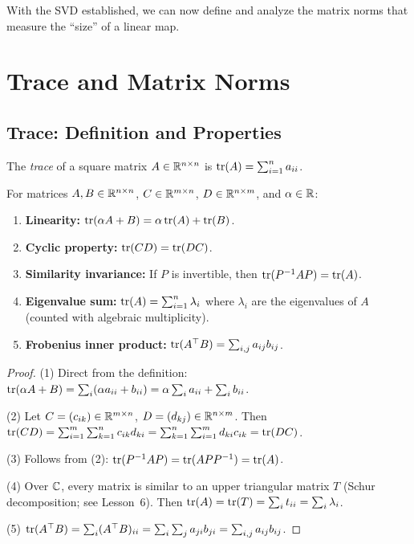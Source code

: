 \documentclass[11pt,a4paper]{article}
\begin{document}
With the SVD established, we can now define and analyze the matrix
norms that measure the ``size'' of a linear map.

\section{Trace and Matrix Norms}
\label{sec:norms}

\subsection{Trace: Definition and Properties}

\begin{definition}[Trace]
\label{def:trace}
The \emph{trace} of a square matrix $A \in \mathbb{R}^{n \times n}$ is
$\operatorname{tr}(A) = \sum_{i=1}^n a_{ii}$.
\end{definition}

\begin{proposition}
\label{prop:trace_properties}
For matrices $A, B \in \mathbb{R}^{n \times n}$, $C \in \mathbb{R}^{m \times n}$,
$D \in \mathbb{R}^{n \times m}$, and $\alpha \in \mathbb{R}$:
\begin{enumerate}[nosep]
  \item \textbf{Linearity:} $\operatorname{tr}(\alpha A + B) = \alpha \operatorname{tr}(A) + \operatorname{tr}(B)$.
  \item \textbf{Cyclic property:} $\operatorname{tr}(CD) = \operatorname{tr}(DC)$.
  \item \textbf{Similarity invariance:} If $P$ is invertible, then
        $\operatorname{tr}(P^{-1}AP) = \operatorname{tr}(A)$.
  \item \textbf{Eigenvalue sum:} $\operatorname{tr}(A) = \sum_{i=1}^n \lambda_i$
        where $\lambda_i$ are the eigenvalues of $A$ (counted with
        algebraic multiplicity).
  \item \textbf{Frobenius inner product:}
        $\operatorname{tr}(A^\top B) = \sum_{i,j} a_{ij} b_{ij}$.
\end{enumerate}
\end{proposition}

\begin{proof}
(1) Direct from the definition:
$\operatorname{tr}(\alpha A + B) = \sum_i (\alpha a_{ii} + b_{ii})
= \alpha \sum_i a_{ii} + \sum_i b_{ii}$.

(2) Let $C = (c_{ik}) \in \mathbb{R}^{m \times n}$, $D = (d_{kj}) \in \mathbb{R}^{n \times m}$.
Then $\operatorname{tr}(CD) = \sum_{i=1}^m \sum_{k=1}^n c_{ik} d_{ki}
= \sum_{k=1}^n \sum_{i=1}^m d_{ki} c_{ik} = \operatorname{tr}(DC)$.

(3) Follows from (2): $\operatorname{tr}(P^{-1}AP) = \operatorname{tr}(APP^{-1}) = \operatorname{tr}(A)$.

(4) Over $\mathbb{C}$, every matrix is similar to an upper triangular matrix $T$
(Schur decomposition; see Lesson~6).  Then $\operatorname{tr}(A) = \operatorname{tr}(T) = \sum_i t_{ii}
= \sum_i \lambda_i$.

(5) $\operatorname{tr}(A^\top B) = \sum_i (A^\top B)_{ii} = \sum_i \sum_j a_{ji} b_{ji}
= \sum_{i,j} a_{ij} b_{ij}$.
\end{proof}
\end{document}

